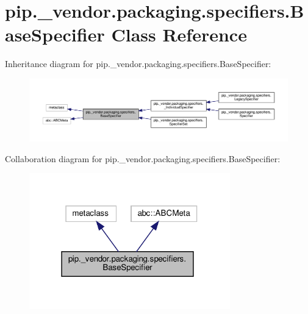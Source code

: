 \hypertarget{classpip_1_1__vendor_1_1packaging_1_1specifiers_1_1BaseSpecifier}{}\section{pip.\+\_\+vendor.\+packaging.\+specifiers.\+Base\+Specifier Class Reference}
\label{classpip_1_1__vendor_1_1packaging_1_1specifiers_1_1BaseSpecifier}


Inheritance diagram for pip.\+\_\+vendor.\+packaging.\+specifiers.\+Base\+Specifier\+:
\nopagebreak
\begin{figure}[H]
\begin{center}
\leavevmode
\includegraphics[width=350pt]{classpip_1_1__vendor_1_1packaging_1_1specifiers_1_1BaseSpecifier__inherit__graph}
\end{center}
\end{figure}


Collaboration diagram for pip.\+\_\+vendor.\+packaging.\+specifiers.\+Base\+Specifier\+:
\nopagebreak
\begin{figure}[H]
\begin{center}
\leavevmode
\includegraphics[width=247pt]{classpip_1_1__vendor_1_1packaging_1_1specifiers_1_1BaseSpecifier__coll__graph}
\end{center}
\end{figure}
